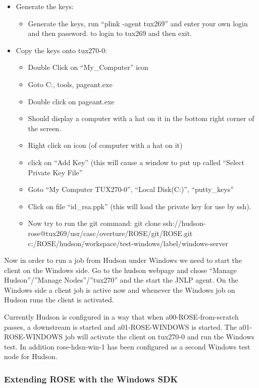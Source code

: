 \begin{itemize}
\item Generate the keys:
\begin{itemize}
   \item Generate the keys, run ``plink -agent tux269'' and enter your
      own login and then password. to login to tux269 and then exit.
\end{itemize}

\item Copy the keys onto tux270-0:
\begin{itemize}
   \item Double Click on ``My\_Computer'' icon
   \item Goto C:, tools, pageant.exe
   \item Double click on pageant.exe
   \item Should display a computer with a hat on it in the bottom right 
corner of the screen.
   \item Right click on icon (of computer with a hat on it)
   \item click on ``Add Key'' (this will cause a window to put up called ``Select Private Key File''
   \item Goto ``My Computer TUX270-0'', ``Local Disk(C:)'', ``putty\_keys''
   \item Click on file ``id\_rsa.ppk''  (this will load the private  key for 
use by ssh).
   \item Now try to run the git command: git clone ssh://hudson-rose@tux269/usr/casc/overture/ROSE/git/ROSE.git c:/ROSE/hudson/workspace/test-windows/label/windows-server
\end{itemize}
\end{itemize}

Now in order to run a job from Hudson under Windows we need to start the client on the Windows side.
Go to the hudson webpage and chose ``Manage Hudson''/''Manage Nodes''/''tux270'' and the start the JNLP agent.
On the Windows side a client job is active now and whenever the Windows job on Hudson runs the client is activated.

Currently Hudson is configured in a way that when a00-ROSE-from-scratch passes, a downstream is started and a01-ROSE-WINDOWS is started. The a01-ROSE-WINDOWS job will activate the client on tux270-0 and run the Windows test. In addition rose-hdsn-win-1 has been configured as a second Windows test node for Hudson.

\subsubsection{Extending ROSE with the Windows SDK}

